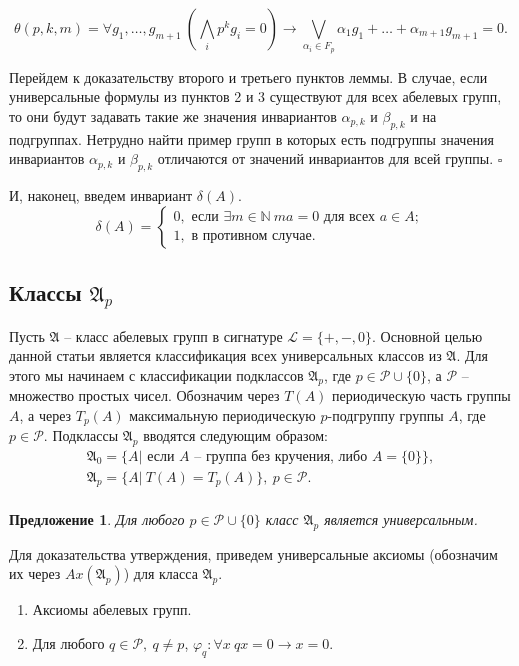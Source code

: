 \documentclass[a4paper,11pt,twoside]{article}
\newtheorem{proposition}{Предложение}[section]
\def\proof{{\noindent{\bf Доказательство.}} }
\def\A{{\mathfrak{A}}}
\def\P{{\mathcal{P}}}
\def\L{{\mathcal{L}}}
\def\N{{\mathbb{N}}}
\begin{document}
$$
\theta(p,k,m) = \forall g_1, \ldots, g_{m+1} \ (\bigwedge_i p^{k}g_{i} = 0) \rightarrow  \bigvee_{\alpha_i \in F_p} \alpha_1g_1 + \ldots + \alpha_{m+1}g_{m+1} = 0.
$$

Перейдем к доказательству второго и третьего пунктов леммы. В случае, если универсальные формулы из пунктов 2 и 3 существуют для  всех абелевых групп, то они будут задавать такие же значения инвариантов $\alpha_{p,k}$ и $\beta_{p,k}$ и на подгруппах. Нетрудно найти пример групп в которых есть подгруппы значения инвариантов $\alpha_{p,k}$ и $\beta_{p,k}$ отличаются от значений инвариантов для всей группы. $\square$

И, наконец, введем инвариант $\delta(A)$.
$$\delta(A) = \left\lbrace 
\begin{array}{l}  
0, \text{ если } \exists m \in \N \ ma = 0 \text{ для всех } a \in A; \\ 
1, \text{ в противном случае.}
\end{array} 
\right.$$


\subsection{Классы $\A_p$}

Пусть $\A$ -- класс абелевых групп в сигнатуре $\L = \{+, -, 0\}.$ Основной целью данной статьи является классификация всех универсальных классов из $\A$. Для этого мы начинаем с классификации подклассов $\A_p$, где $p \in \P \cup \{0\}$, а $\P$ -- множество простых чисел. Обозначим через $T(A)$ периодическую часть группы $A$, а через $T_p(A)$ максимальную периодическую $p$-подгруппу группы $A$, где $p \in \P$. Подклассы $\A_p$ вводятся следующим образом:
$$\begin{array}{c}
\A_0 = \{A |\text{ если } A \text{ -- группа без кручения, либо } A = \{0\} \}, \\
\A_p = \{A | \ T(A) = T_p(A)\}, \ p \in \P. \\
\end{array}$$ 

\begin{proposition}
Для любого $p \in \P \cup \{0\}$ класс $\A_p$ является универсальным.
\end{proposition}
\proof
Для доказательства утверждения, приведем универсальные аксиомы (обозначим их через $Ax(\A_p)$) для класса $\A_p$. 
\begin{enumerate}
\item Аксиомы абелевых групп.
\item Для любого $q \in \P, \ q \neq p$, $\varphi_q : \forall x \ qx = 0 \rightarrow x = 0.$
\end{enumerate}
\end{document}
